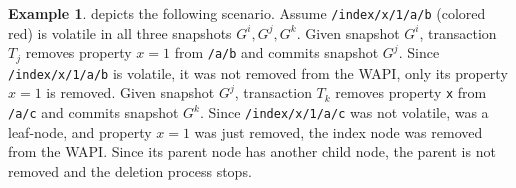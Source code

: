 \documentclass[abstracton,12pt]{scrartcl}
\theoremstyle{definition}
\newtheorem{example}{Example}
\begin{document}
\begin{example}
     depicts the following scenario.
    Assume \texttt{/index/x/1/a/b} (colored red) is volatile in all three snapshots $G^i, G^j, G^k$.
    Given snapshot $G^i$, transaction $T_j$ removes property $x=1$ from \texttt{/a/b} and commits snapshot $G^j$.
    Since \texttt{/index/x/1/a/b} is volatile, it was not removed from the WAPI, only its property $x=1$ is removed.
    Given snapshot $G^j$, transaction $T_k$ removes property \texttt{x} from \texttt{/a/c} and commits snapshot $G^k$.
    Since \texttt{/index/x/1/a/c} was not volatile, was a leaf-node, and property $x=1$ was just removed, the index node was removed from the WAPI.
    Since its parent node has another child node, the parent is not removed and the deletion process stops.
\end{example}
\end{document}
